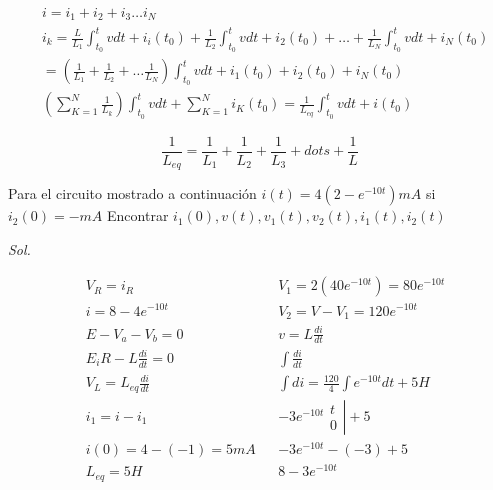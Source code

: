 \begin{align*}
	 & i=i_{1}+i_{2}+i_{3}\dots i_{N}                                                                                                                                                                        \\
	 & i_{k}=\frac{L}{L_{1}}\int_{t_{0}}^{t}v dt +i_{i}\left(t_{0}\right)+\frac{1}{L_{2}}\int_{t_{0}}^{t}v dt + i_{2}\left(t_{0}\right)+\dots +\frac{1}{L_{N}}\int_{t_{0}}^{t}v dt + i_{N}\left(t_{0}\right) \\
	 & =\left(\frac{1}{L_{1}}+\frac{1}{L_{2}}+\dots \frac{1}{L_{N}}\right)\int_{t_{0}}^{t}v dt + i_{1}\left(t_{0}\right)+i_{2}\left(t_{0}\right)+i_{N}\left(t_{0}\right)                                     \\
	 & \left(\sum_{K=1}^{N} \frac{1}{L_{k}} \right)\int_{t_{0}}^{t}v dt+\sum_{K=1}^{N} i_{K}\left(t_{0}\right)=\frac{1}{L_{eq}}\int_{t_{0}}^{t}v dt+i\left(t_{0}\right)
\end{align*}


\begin{equation}
	\frac{1}{L_{eq}}=\frac{1}{L_{1}}+\frac{1}{L_{2}}+\frac{1}{L_{3}}+ dots +\frac{1}{L}
\end{equation}


\begin{example}
	Para el circuito mostrado a continuación $i(t)=4(2-e^{-10t})mA$ si $i_{2}(0)=-mA$ Encontrar $i_{1}(0), v(t), v_{1}(t),v_{2}(t), i_{1}(t),i_{2}(t)$
\end{example}
\textit{ Sol. }

\begin{align*}
	 & V_{R}=i_{R}               &  & V_{1}=2\left(40e^{-10t}\right)=80e^{-10t}                   \\
	 & i=8-4e^{-10t}             &  & V_{2}=V-V_{1}=120e^{-10t}                                   \\
	 & E-V_{a}-V_{b}=0           &  & v=L \frac{di}{dt}                                           \\
	 & E_iR-L \frac{di}{dt}=0    &  & \int \frac{di}{dt}                                          \\
	 & V_{L}=L_{eq}\frac{di}{dt} &  & \int di=\frac{120}{4}\int e^{-10t}dt+5H                     \\
	 & i_{1}=i-i_1            &  & -3e^{-10t} \left.\begin{matrix} t\\ 0 \end{matrix}\right|+5 \\
	 & i(0)=4-(-1)=5mA           &  & -3e^{-10t}-(-3)+5                                           \\
	 & L_{eq}=5H                 &  & 8-3e^{-10t}                                                 \\
\end{align*}

